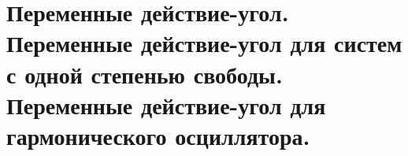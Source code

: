 \section{Переменные действие-угол. Переменные действие-угол для систем с одной степенью свободы. Переменные действие-угол для гармонического осциллятора.}\label{chasec27}



\newpage